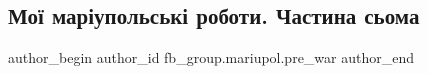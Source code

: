  
 
 
 
 

\subsection{Мої маріупольські роботи. Частина сьома}
\label{sec:12_02_2023.fb.fb_group.mariupol.pre_war.4.mo__mar_upolsk__robo}

\ifcmt
 author_begin
   author_id fb_group.mariupol.pre_war
 author_end
\fi
